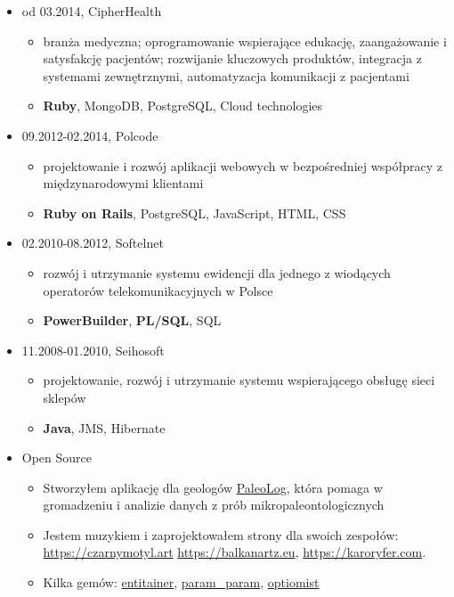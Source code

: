 \documentclass[a4paper]{article}
\begin{document}
\begin{itemize}
  \item
  od 03.2014,
  CipherHealth
  \begin{itemize}
    \item
      branża medyczna; oprogramowanie wspierające edukację, zaangażowanie i satysfakcję pacjentów; rozwijanie kluczowych produktów, integracja z systemami zewnętrznymi, automatyzacja komunikacji z pacjentami
    \item
      \textbf{Ruby}, MongoDB, PostgreSQL, Cloud technologies
  \end{itemize}
  \item
    09.2012-02.2014,
    Polcode
    \begin{itemize}
      \item
        projektowanie i rozwój aplikacji webowych w bezpośredniej współpracy z międzynarodowymi klientami
      \item
        \textbf{Ruby on Rails}, PostgreSQL, JavaScript, HTML, CSS
    \end{itemize}
  \item
    02.2010-08.2012,
    Softelnet
    \begin{itemize}
      \item
        rozwój i utrzymanie systemu ewidencji dla jednego z wiodących operatorów telekomunikacyjnych w Polsce
      \item
        \textbf{PowerBuilder}, \textbf{PL/SQL}, SQL
    \end{itemize}
  \item
    11.2008-01.2010,
    Seihosoft
    \begin{itemize}
      \item
        projektowanie, rozwój i utrzymanie systemu wspierającego obsługę sieci sklepów
      \item
        \textbf{Java}, JMS, Hibernate
    \end{itemize}
  \item
    Open Source
    \begin{itemize}
      \item
        Stworzyłem aplikację dla geologów \href{https://github.com/mradmacher/paleolog}{PaleoLog}, która pomaga w gromadzeniu i analizie danych z prób mikropaleontologicznych
      \item
        Jestem muzykiem i zaprojektowałem strony dla swoich zespołów: \href{https://czarnymotyl.art}{https://czarnymotyl.art} \href{https://balkanartz.eu}{https://balkanartz.eu}, \href{https://karoryfer.com}{https://karoryfer.com}.
      \item
        Kilka gemów: \href{https://github.com/mradmacher/entitainer}{entitainer}, \href{https://github.com/mradmacher/param\_param}{param\_param}, \href{https://github.com/mradmacher/optiomist}{optiomist}
    \end{itemize}
\end{itemize}
\end{document}
